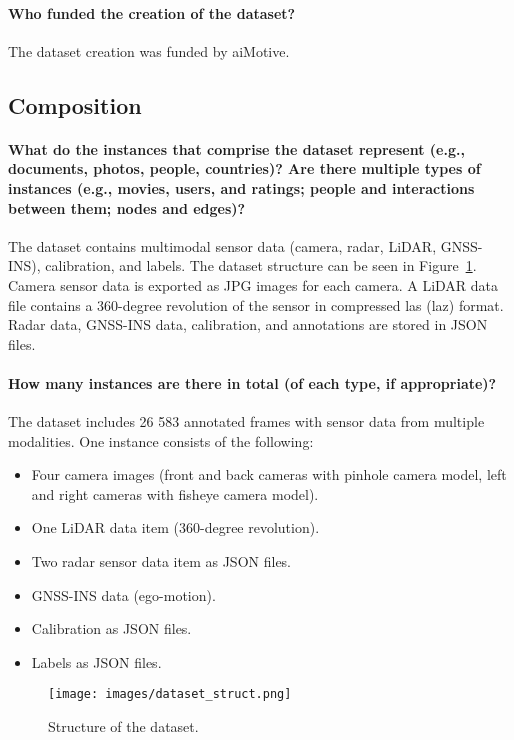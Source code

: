 \documentclass{article}
\begin{document}
\paragraph{Who funded the creation of the dataset?} The dataset creation was funded by aiMotive.

\subsection{Composition}
\paragraph{What do the instances that comprise the dataset represent (e.g., documents, photos, people, countries)? Are there multiple types of instances (e.g., movies, users, and ratings; people and interactions between them; nodes and edges)?} The dataset contains multimodal sensor data (camera, radar, LiDAR, GNSS-INS), calibration, and labels. The dataset structure can be seen in Figure~\ref{fig:data_struct}. Camera sensor data is exported as JPG images for each camera. A LiDAR data file contains a 360-degree revolution of the sensor in compressed las (laz) format. Radar data, GNSS-INS data, calibration, and annotations are stored in JSON files.

\paragraph{How many instances are there in total (of each type, if appropriate)?}
The dataset includes 26 583 annotated frames with sensor data from multiple modalities. One instance consists of the following:
\begin{itemize}
  \item Four camera images (front and back cameras with pinhole camera model, left and right cameras with fisheye camera model).
  \item One LiDAR data item (360-degree revolution).
  \item Two radar sensor data item as JSON files.
  \item GNSS-INS data (ego-motion).
  \item Calibration as JSON files.
  \item Labels as JSON files.
\end{itemize}


\begin{figure}[t]
  \centering
   \texttt{[image: images/dataset\_struct.png]}
   \caption{Structure of the dataset.}
   \label{fig:data_struct}
\end{figure}
\end{document}
